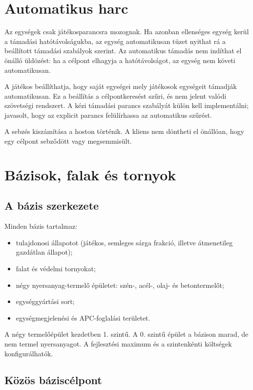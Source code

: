 \documentclass[12pt,a4paper]{article}
\begin{document}
\section{Automatikus harc}

Az egységek csak játékosparancsra mozognak. Ha azonban ellenséges egység kerül a támadási hatótávolságukba, az egység automatikusan tüzet nyithat rá a beállított támadási szabályok szerint. Az automatikus támadás nem indíthat el önálló üldözést: ha a célpont elhagyja a hatótávolságot, az egység nem követi automatikusan.

A játékos beállíthatja, hogy saját egységei mely játékosok egységeit támadják automatikusan. Ez a beállítás a célpontkeresést szűri, és nem jelent valódi szövetségi rendszert. A kézi támadási parancs szabályát külön kell implementálni; javasolt, hogy az explicit parancs felülírhassa az automatikus szűrést.

A sebzés kiszámítása a hoston történik. A kliens nem döntheti el önállóan, hogy egy célpont sebződött vagy megsemmisült.

\section{Bázisok, falak és tornyok}

\subsection{A bázis szerkezete}

Minden bázis tartalmaz:
\begin{itemize}
  \item tulajdonosi állapotot (játékos, semleges sárga frakció, illetve átmenetileg gazdátlan állapot);
  \item falat és védelmi tornyokat;
  \item négy nyersanyag-termelő épületet: szén-, acél-, olaj- és betontermelőt;
  \item egységgyártási sort;
  \item egységmegjelenési és APC-foglalási területet.
\end{itemize}

A négy termelőépület kezdetben 1. szintű. A 0. szintű épület a bázison marad, de nem termel nyersanyagot. A fejlesztési maximum és a szintenkénti költségek konfigurálhatók.

\subsection{Közös báziscélpont}
\end{document}
